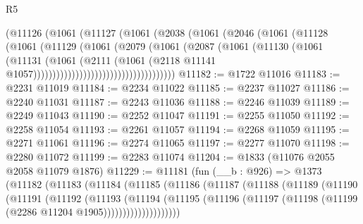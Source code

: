\begin{lexlean}{R5}
\begin{coremodule}
                                (@11126
                                  (@1061
                                    (@11127
                                      (@1061
                                        (@2038
                                          (@1061
                                            (@2046
                                              (@1061
                                                (@11128
                                                  (@1061
                                                    (@11129
                                                      (@1061
                                                        (@2079
                                                          (@1061
                                                            (@2087
                                                              (@1061
                                                                (@11130
                                                                  (@1061
                                                                    (@11131
                                                                      (@1061
                                                                        (@2111
                                                                          (@1061
                                                                            (@2118
                                                                              @11141
                                                                              @1057)))))))))))))))))))))))))))))))))))))
@11182 := @1722 @11016
@11183 := @2231 @11019
@11184 := @2234 @11022
@11185 := @2237 @11027
@11186 := @2240 @11031
@11187 := @2243 @11036
@11188 := @2246 @11039
@11189 := @2249 @11043
@11190 := @2252 @11047
@11191 := @2255 @11050
@11192 := @2258 @11054
@11193 := @2261 @11057
@11194 := @2268 @11059
@11195 := @2271 @11061
@11196 := @2274 @11065
@11197 := @2277 @11070
@11198 := @2280 @11072
@11199 := @2283 @11074
@11204 := @1833 (@11076 @2055 @2058 @11079 @1876)
@11229 := @11181
    (fun (__b : @926) =>
    @1373
      (@11182
        (@11183
          (@11184
            (@11185
              (@11186
                (@11187
                  (@11188
                    (@11189
                      (@11190
                        (@11191
                          (@11192
                            (@11193
                              (@11194
                                (@11195
                                  (@11196
                                    (@11197 (@11198 (@11199 (@2286 @11204 @1905))))))))))))))))))))

\end{coremodule}
\end{lexlean}
